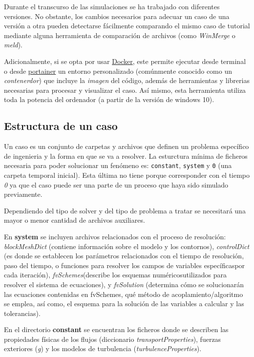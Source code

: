 Durante el transcurso de las simulaciones se ha trabajado con diferentes
versiones. No obstante, los cambios necesarios para adecuar un caso de
una versión a otra pueden detectarse fácilmente comparando el mismo caso
de tutorial mediante alguna herramienta de comparación de archivos (como
\emph{WinMerge} o \emph{meld}).

Adicionalmente, si se opta por usar
\href{https://docs.docker.com/docker-for-windows/}{Docker}, este permite
ejecutar desde terminal o desde
\href{https://github.com/portainer/portainer}{portainer} un entorno
personalizado (comúnmente conocido como un \emph{contenerdor}) que
incluye la \emph{imagen} del código, además de herramientas y librerias
necesarias para procesar y visualizar el caso. Así mismo, esta
herramienta utiliza toda la potencia del ordenador (a partir de la
versión de windows 10).

\subsection{Estructura de un caso}\label{header-n103}

Un caso es un conjunto de carpetas y archivos que definen un problema
específico de ingenieria y la forma en que se va a resolver. La
esturctura mínima de ficheros necesaria para poder solucionar un
fenómeno es: \texttt{constant}, \texttt{system} y \texttt{0} (una
carpeta temporal inicial). Esta última no tiene porque corresponder con
el tiempo \emph{0} ya que el caso puede ser una parte de un proceso que
haya sido simulado previamente.

Dependiendo del tipo de solver y del tipo de problema a tratar se
necesitará una mayor o menor cantidad de archivos auxiliares.

En \textbf{system} se incluyen archivos relacionados con el proceso de
resolución: \emph{blockMeshDict} (contiene información sobre el modelo y
los contornos), \emph{controlDict} (es donde se establecen los
parámetros relacionados con el tiempo de resolución, paso del tiempo, o
funciones para resolver los campos de variables específicaspor cada
iteración), \emph{fvSchemes}(describe los esquemas numéricosutilizados
para resolver el sistema de ecuaciones), y \emph{fvSolution} (determina
cómo se solucionarán las ecuaciones contenidas en fvSchemes, qué método
de acoplamiento/algoritmo se emplea, así como, el esquema para la
solución de las variables a calcular y las tolerancias).

En el directorio \textbf{constant} se encuentran los ficheros donde se
describen las propiedades físicas de los flujos (diccionario
\emph{transportProperties}), fuerzas exteriores (\emph{g}) y los modelos
de turbulencia (\emph{turbulenceProperties}).

